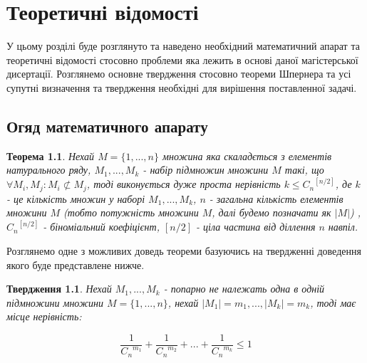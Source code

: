 \chapter{Теоретичні відомості}


У цьому розділі буде розглянуто та наведено необхідний математичний апарат та теоретичні відомості стосовно проблеми яка лежить в основі даної магістерської дисертації. Розглянемо основне твердження стосовно теореми Шпернера та усі супутні визначення та твердження необхідні для вирішення поставленної задачі.


\section{Огяд математичного апарату}
\newtheorem{theorem}{Теорема}
\newtheorem{condition}{Твердження}
\newtheorem{corollary}{Наслідок}
\newtheorem{definition}{Визначення}
\newtheorem{example}{Приклад}
\begin{theorem}
Нехай $ M = \{1,...,n\} $ множина яка скаладється з елементів натурального ряду,
$M_1,...,M_k$ - набір підмножин множини $ M $ такі, що $ \forall M_i,M_j: M_i \not\subset M_j $, 
тоді виконується дуже проста нерівність $k \leq {C_n}^{[n/2]}$, де $ k $ - це кількість множин у наборі $M_1,...,M_k$, $ n $ - загальна кількість елементів множини $ M $ (тобто потужність множини $ M $, далі будемо позначати як $ |M| $) \cite{comb:1988}, $ {C_n}^{[n/2]} $ - біноміальний коефіцієнт, $ [n/2] $ - ціла частина від діллення $ n $ навпіл.
\end{theorem}

Розглянемо одне з можливих доведь теореми базуючись на твердженні доведення якого буде представлене нижче.

\begin{condition}
Нехай $ M_1,...,M_k $ - попарно не належать одна в одній підмножини множини $ M = \{1,...,n\} $, нехай $ |M_1| = m_1,...,|M_k| = m_k $, тоді має місце нерівність:
\end{condition}
\begin{large}
\begin{equation} \label{eq:binomial} 
\frac{1}{{C_n}^{m_1}} + \frac{1}{{C_n}^{m_2}} + ... + \frac{1}{{C_n}^{m_k}} \leq 1
\end{equation}
\end{large}
\newline


